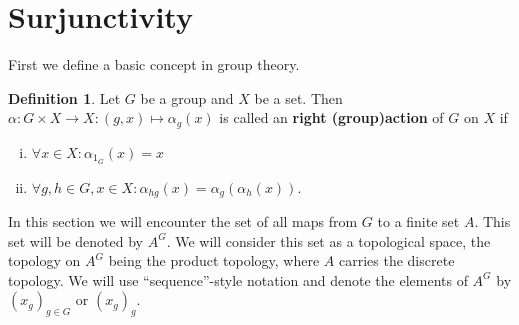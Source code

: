 \documentclass[titlepage, a4paper]{article}
\newcommand{\Z}{\mathbb{Z}}
\DeclareMathOperator{\sym}{Sym}
\theoremstyle{definition}
\newtheorem{definition}[theorem]{Definition}
\theoremstyle{remark}
\begin{document}


 

    \section{Surjunctivity}\label{sec:surjunctivity}

    First we define a basic concept in group theory.

    \begin{definition} %
	    Let $G$ be a group and $X$ be a set. Then $\alpha: G \times X \to X: (g,x) \mapsto \alpha_g(x)$ is called an \textbf{right (group)action} of $G$ on $X$ if
        \begin{enumerate}[(i)]
		\item $\forall x \in X: \alpha_{1_G}(x) = x$
            \item $\forall g,h \in G, x\in X: \alpha_{hg}(x) = \alpha_g(\alpha_h(x))$.
        \end{enumerate}
    \end{definition}

    In this section we will encounter the set of all maps from $G$ to a finite set $A$. This set will be denoted by $A^G$. We will consider this set as a topological space, the topology on $A^G$ being the product topology, where $A$ carries the discrete topology. We will use ``sequence''-style notation and denote the elements of $A^G$ by $(x_g)_{g \in G}$ or $(x_g)_g$.
\end{document}
